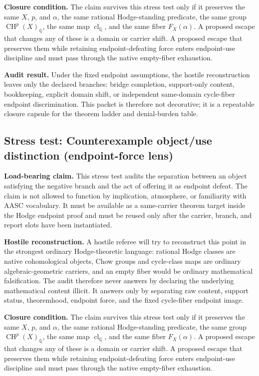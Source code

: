 \documentclass[11pt]{article}
\newcommand{\QQ}{\mathbb{Q}}
\newcommand{\CH}{\operatorname{CH}}
\newcommand{\clQ}{\operatorname{cl}_{\QQ}}
\begin{document}
\par\noindent\textbf{Closure condition.} The claim survives this stress test only if it preserves the same $X$, $p$, and $\alpha$, the same rational Hodge-standing predicate, the same group $\CH^p(X)_\QQ$, the same map $\clQ$, and the same fiber $F_X(\alpha)$. A proposed escape that changes any of these is a domain or carrier shift. A proposed escape that preserves them while retaining endpoint-defeating force enters endpoint-use discipline and must pass through the native empty-fiber exhaustion.

\par\noindent\textbf{Audit result.} Under the fixed endpoint assumptions, the hostile reconstruction leaves only the declared branches: bridge completion, support-only content, bookkeeping, explicit domain shift, or independent same-domain cycle-fiber endpoint discrimination. This packet is therefore not decorative; it is a repeatable closure capsule for the theorem ladder and denial-burden table.


\subsection{Stress test: Counterexample object/use distinction (endpoint-force lens)}

\par\noindent\textbf{Load-bearing claim.} This stress test audits the separation between an object satisfying the negative branch and the act of offering it as endpoint defeat. The claim is not allowed to function by implication, atmosphere, or familiarity with AASC vocabulary. It must be available as a same-carrier theorem target inside the Hodge endpoint proof and must be reused only after the carrier, branch, and report slots have been instantiated.

\par\noindent\textbf{Hostile reconstruction.} A hostile referee will try to reconstruct this point in the strongest ordinary Hodge-theoretic language: rational Hodge classes are native cohomological objects, Chow groups and cycle-class maps are ordinary algebraic-geometric carriers, and an empty fiber would be ordinary mathematical falsification. The audit therefore never answers by declaring the underlying mathematical content illicit. It answers only by separating raw content, support status, theoremhood, endpoint force, and the fixed cycle-fiber endpoint image.

\par\noindent\textbf{Closure condition.} The claim survives this stress test only if it preserves the same $X$, $p$, and $\alpha$, the same rational Hodge-standing predicate, the same group $\CH^p(X)_\QQ$, the same map $\clQ$, and the same fiber $F_X(\alpha)$. A proposed escape that changes any of these is a domain or carrier shift. A proposed escape that preserves them while retaining endpoint-defeating force enters endpoint-use discipline and must pass through the native empty-fiber exhaustion.
\end{document}
